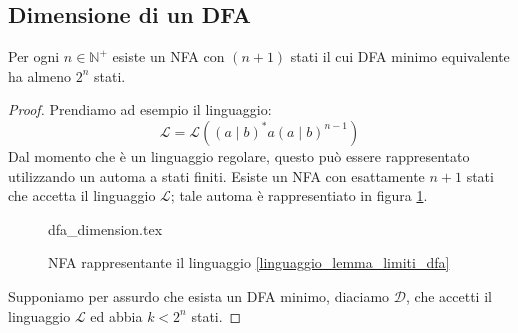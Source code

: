 \documentclass[class=book, crop=false, oneside, 12pt]{standalone}
\begin{document}
\subsection{Dimensione di un DFA}
\begin{lemma}
    Per ogni \(n \in  \mathbb{N}^+\) esiste un NFA con \((n+1)\) stati il cui DFA minimo equivalente ha almeno \(2^n\) stati.
\end{lemma}
\begin{proof}
    Prendiamo ad esempio il linguaggio:
    \begin{equation}
        \mathcal{L} = \mathcal{L}((a\mid b)^\ast a (a\mid b)^{n-1})  
        \label{linguaggio_lemma_limiti_dfa}
    \end{equation}
    Dal momento che è un linguaggio regolare, questo può essere rappresentato utilizzando un automa a stati finiti. Esiste un NFA con esattamente \(n+1\) stati che accetta il linguaggio \(\mathcal{L}\); tale automa è rappresentiato in figura \ref{nfa_lemma_limiti_dfa}.
    \begin{figure}[H]
        \centering
        {dfa_dimension.tex}
        \caption{NFA rappresentante il linguaggio \ref{linguaggio_lemma_limiti_dfa}}
        \label{nfa_lemma_limiti_dfa}
    \end{figure}
    Supponiamo per assurdo che esista un DFA minimo, diaciamo \(\mathcal{D}\), che accetti il linguaggio \(\mathcal{L}\) ed abbia \(k<2^n\) stati.


\end{proof}
\end{document}

